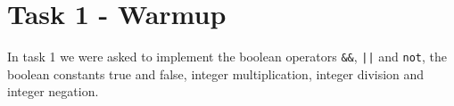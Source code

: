 \documentclass[11pt]{article}
\begin{document}

    \clearpage
    \maketitle
    \thispagestyle{empty}

    \newpage

    \tableofcontents

    \newpage


    \section{Task 1 - Warmup}
    In task 1 we were asked to implement the boolean operators \texttt{\&\&},
    \texttt{||} and \texttt{not}, the boolean constants true and false, integer
    multiplication, integer division and integer negation. \\
\end{document}
